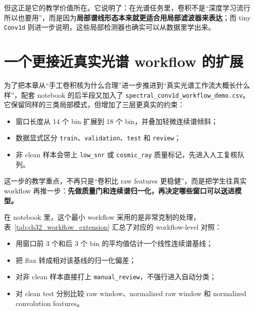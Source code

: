 但这正是它的教学价值所在。它说明了：在光谱任务里，卷积不是“深度学习流行所以也要用”，而是因为\textbf{局部谱线形态本来就更适合用局部滤波器来表达}；而 tiny \texttt{Conv1d} 则进一步说明，这些局部检测器也确实可以从数据里学出来。

\section{一个更接近真实光谱 workflow 的扩展}

为了把本章从“手工卷积核为什么合理”进一步推进到“真实光谱工作流大概长什么样”，配套 notebook 的后半段又加入了 \nolinkurl{spectral_conv1d_workflow_demo.csv}。它保留同样的三类局部模式，但增加了三层更真实的约束：

\begin{itemize}
    \item 窗口长度从 14 个 bin 扩展到 18 个 bin，并叠加轻微连续谱倾斜；
    \item 数据显式区分 \texttt{train}、\texttt{validation}、\texttt{test} 和 \texttt{review}；
    \item 非 clean 样本会带上 \texttt{low\_snr} 或 \texttt{cosmic\_ray} 质量标记，先进入人工复核队列。
\end{itemize}

这一步的教学重点，不再只是“卷积比 raw features 更稳健”，而是把学生往真实 workflow 再推一步：\textbf{先做质量门和连续谱归一化，再决定哪些窗口可以送进模型。}

在 notebook 里，这个最小 workflow 采用的是非常克制的处理，表~\ref{tab:ch32_workflow_extension} 汇总了对应的 workflow-level 对照：

\begin{itemize}
    \item 用窗口前 3 个和后 3 个 bin 的平均值估计一个线性连续谱基线；
    \item 把 flux 转成相对该基线的归一化偏差；
    \item 对非 clean 样本直接打上 \texttt{manual\_review}，不强行进入自动分类；
    \item 对 clean test 分别比较 raw window、normalized raw window 和 normalized convolution features。
\end{itemize}

